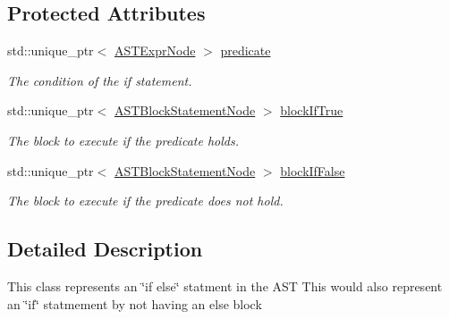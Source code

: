 \subsection*{Protected Attributes}
\begin{DoxyCompactItemize}
\item 
\mbox{\label{classparser_1_1ast_1_1ASTIfStatementNode_aa03b517ecf838b4ca92290f85873dacc}} 
std\+::unique\+\_\+ptr$<$ \hyperlink{classparser_1_1ast_1_1ASTExprNode}{A\+S\+T\+Expr\+Node} $>$ \hyperlink{classparser_1_1ast_1_1ASTIfStatementNode_aa03b517ecf838b4ca92290f85873dacc}{predicate}
\begin{DoxyCompactList}\small\item\em The condition of the if statement. \end{DoxyCompactList}\item 
\mbox{\label{classparser_1_1ast_1_1ASTIfStatementNode_a41ce2a7eef7e04f060d06fd39b1634e9}} 
std\+::unique\+\_\+ptr$<$ \hyperlink{classparser_1_1ast_1_1ASTBlockStatementNode}{A\+S\+T\+Block\+Statement\+Node} $>$ \hyperlink{classparser_1_1ast_1_1ASTIfStatementNode_a41ce2a7eef7e04f060d06fd39b1634e9}{block\+If\+True}
\begin{DoxyCompactList}\small\item\em The block to execute if the predicate holds. \end{DoxyCompactList}\item 
\mbox{\label{classparser_1_1ast_1_1ASTIfStatementNode_a763d7c0df1b663ba69a38f5b744586f0}} 
std\+::unique\+\_\+ptr$<$ \hyperlink{classparser_1_1ast_1_1ASTBlockStatementNode}{A\+S\+T\+Block\+Statement\+Node} $>$ \hyperlink{classparser_1_1ast_1_1ASTIfStatementNode_a763d7c0df1b663ba69a38f5b744586f0}{block\+If\+False}
\begin{DoxyCompactList}\small\item\em The block to execute if the predicate does not hold. \end{DoxyCompactList}\end{DoxyCompactItemize}


\subsection{Detailed Description}
This class represents an \char`\"{}if else\char`\"{} statment in the A\+ST This would also represent an \char`\"{}if\char`\"{} statmement by not having an else block 

